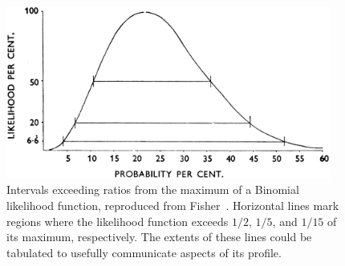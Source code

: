 \begin{figure}[tp]
\centering
\includegraphics[width=0.95\textwidth]{figures/searches_fisher_likelihood_binomial.png}
\caption[
Intervals exceeding ratios from the maximum of a Binomial likelihood function,
reproduced from Fisher
]{%
Intervals exceeding ratios from the maximum of a Binomial likelihood function,
reproduced from Fisher~\cite{fisher1956statistical}.
Horizontal lines mark regions where the likelihood function exceeds
$1/2$, $1/5$, and $1/15$ of its maximum, respectively.
The extents of these lines could be tabulated to usefully communicate aspects
of its profile.
}
\label{fig:searches_fisher_likelihood}
\end{figure}

